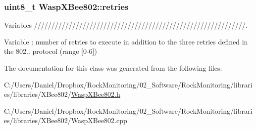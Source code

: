 \subsubsection[{\texorpdfstring{retries}{retries}}]{\setlength{\rightskip}{0pt plus 5cm}uint8\+\_\+t Wasp\+X\+Bee802\+::retries}\hypertarget{class_wasp_x_bee802_a7d35fb23b4d1cf6b9c542b31e0d34250}{}\label{class_wasp_x_bee802_a7d35fb23b4d1cf6b9c542b31e0d34250}


Variables /////////////////////////////////////////////////////////////. 

Variable \+: number of retries to execute in addition to the three retries defined in the 802.. protocol (range \mbox{[}0-\/6\mbox{]}) 

The documentation for this class was generated from the following files\+:\begin{DoxyCompactItemize}
\item 
C\+:/\+Users/\+Daniel/\+Dropbox/\+Rock\+Monitoring/02\+\_\+\+Software/\+Rock\+Monitoring/libraries/libraries/\+X\+Bee802/\hyperlink{_wasp_x_bee802_8h}{Wasp\+X\+Bee802.\+h}\item 
C\+:/\+Users/\+Daniel/\+Dropbox/\+Rock\+Monitoring/02\+\_\+\+Software/\+Rock\+Monitoring/libraries/libraries/\+X\+Bee802/Wasp\+X\+Bee802.\+cpp\end{DoxyCompactItemize}
